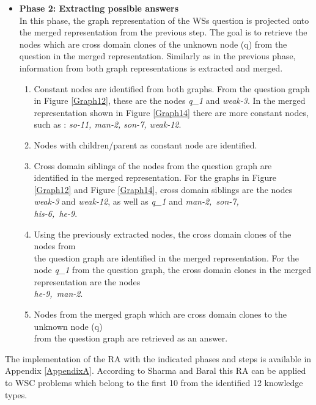 \begin{itemize}
	\item \textbf{Phase 2: Extracting possible answers}\\
	In this phase, the graph representation of the WSs question is projected onto the merged representation from the previous step. The goal is to retrieve the nodes which are cross domain clones of the unknown node (q) from the question in the merged representation. Similarly as in the previous phase, information from both graph representations is extracted and merged.
	\begin{enumerate}
		\item Constant nodes are identified from both graphs. From the question graph in Figure \ref{Graph12}, these are the nodes \textit{q\_1} and \textit{weak-3}. In the merged representation shown in Figure \ref{Graph14} there are more constant nodes, such as : \textit{so-11, man-2, son-7, weak-12}.
		\item Nodes with children/parent as constant node are identified. 
		\item Cross domain siblings of the nodes from the question graph are \\ identified in the merged representation. For the graphs in Figure \ref{Graph12} and Figure \ref{Graph14}, cross domain siblings are the nodes \textit{weak-3} and \textit{weak-12}, as well as \textit{q\_1} and \textit{man-2,~son-7,\\his-6,~he-9}. 
		\item Using the previously extracted nodes, the cross domain clones of the nodes from\\ the question graph are identified in the merged representation. For the node \textit{q\_1} from the question graph, the cross domain clones in the merged representation are the nodes\\\textit{he-9,~man-2}.
		\item Nodes from the merged graph which are cross domain clones to the unknown node (q)\\ from the question graph are retrieved as an answer.
	\end{enumerate}
\end{itemize}

The implementation of the RA with the indicated phases and steps is available in Appendix \ref{AppendixA}. 
According to Sharma and Baral \cite{2018CommonsenseKT} this RA can be applied to WSC problems which belong to the first 10 from the identified 12 knowledge types. 

